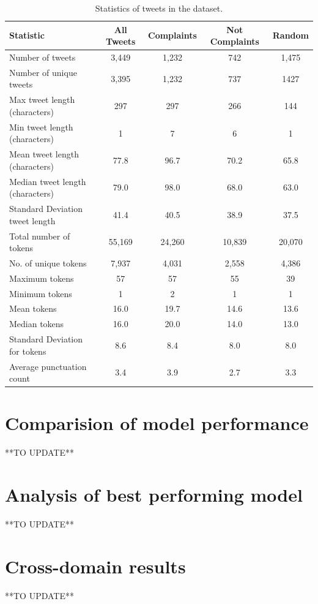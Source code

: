 \begin{table}[htbp]
    \captionsetup{font=small}
    \centering
    \begin{tabularx}{\textwidth}{|X|c|c|c|c|}
        \hline
        \rowcolor[gray]{0.7}
        Statistic                        & All Tweets & Complaints & Not Complaints & Random \\
        \hline
        Number of tweets                 & 3,449      & 1,232      & 742            & 1,475  \\
        \hline
        Number of unique tweets          & 3,395      & 1,232      & 737            & 1427   \\
        \hline
        \hline
        Max tweet length (characters)    & 297        & 297        & 266            & 144    \\
        \hline
        Min tweet length (characters)    & 1          & 7          & 6              & 1      \\
        \hline
        Mean tweet length (characters)   & 77.8       & 96.7       & 70.2           & 65.8   \\
        \hline
        Median tweet length (characters) & 79.0       & 98.0       & 68.0           & 63.0   \\
        \hline
        Standard Deviation tweet length  & 41.4       & 40.5       & 38.9           & 37.5   \\
        \hline
        \hline
        Total number of tokens           & 55,169     & 24,260     & 10,839         & 20,070 \\
        \hline
        No. of unique tokens             & 7,937      & 4,031      & 2,558          & 4,386  \\
        \hline
        Maximum tokens                   & 57         & 57         & 55             & 39     \\
        \hline
        Minimum tokens                   & 1          & 2          & 1              & 1      \\
        \hline
        Mean tokens                      & 16.0       & 19.7       & 14.6           & 13.6   \\
        \hline
        Median tokens                    & 16.0       & 20.0       & 14.0           & 13.0   \\
        \hline
        Standard Deviation for tokens    & 8.6        & 8.4        & 8.0            & 8.0    \\
        \hline
        \hline
        Average punctuation count        & 3.4        & 3.9        & 2.7            & 3.3    \\
        \hline
    \end{tabularx}
    \caption{Statistics of tweets in the dataset.}
    \label{tab: tweets_statistics}
\end{table}



\section{Comparision of model performance}
**TO UPDATE**

\section{Analysis of best performing model}
**TO UPDATE**

\section{Cross-domain results}
**TO UPDATE**